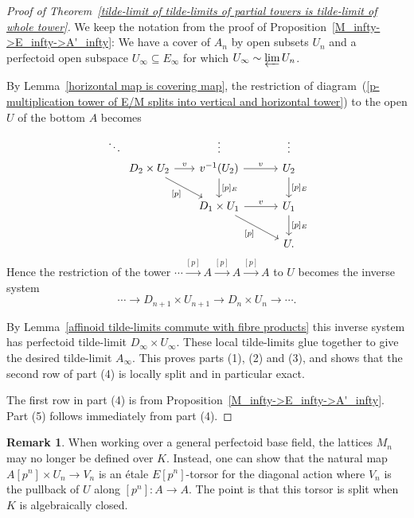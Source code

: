 \documentclass[10pt,oneside]{amsart}
\theoremstyle{definition}
\newtheorem{remark}[theorem]{Remark}
\begin{document}
	\begin{proof}[Proof of Theorem~\ref{tilde-limit of tilde-limits of partial towers is tilde-limit of whole tower}]
We keep the notation from the proof of Proposition~\ref{M_infty->E_infty->A'_infty}: We have a cover of $A_n$ by open subsets $U_n$ and a  perfectoid open subspace $U_\infty\subseteq E_\infty$ for which $U_\infty\sim \varprojlim U_n$.
	 
By Lemma~\ref{horizontal map is covering map}, the restriction of diagram~(\ref{p-multiplication tower of E/M splits into vertical and horizontal tower}) to the open $U$ of the bottom $A$ becomes
\begin{equation*}
		\begin{tikzcd}[column sep={1.1cm,between origins},row sep={0.6cm,between origins}]
			\ddots  &  &  & \vdots &  & \vdots \\
			& D_2\times U_2 \arrow[rr,"v"] \arrow[rrdd, "{[p]}"'] &  & v^{-1}(U_2) \arrow[rr,"v"] \arrow[dd,"{[p]_E}"] &  & U_2 \arrow[dd,"{[p]_E}"] \\
			&  &  &  &  &  \\
			&  &  & D_1\times U_1 \arrow[rrdd, "{[p]}"'] \arrow[rr,"v"] &  & U_1 \arrow[dd,"{[p]_E}"] \\
			&  &  &  &  &  \\
			&  &  &  &  & U.
		\end{tikzcd}
\end{equation*}
Hence the restriction of the tower $\cdots\xrightarrow{[p]}A \xrightarrow{[p]}A\xrightarrow{[p]}A$ to $U$ becomes the inverse system 
	 \[\cdots\rightarrow D_{n+1}\times U_{n+1}\rightarrow D_{n}\times U_n\rightarrow \cdots.\]
	
	By Lemma~\ref{affinoid tilde-limits commute with fibre products} this inverse system has perfectoid tilde-limit $D_\infty \times U_\infty$. These local tilde-limits glue together to give the desired tilde-limit $A_\infty$. This proves parts (1), (2) and (3), and shows that the second row of part (4) is locally split and in particular exact.
	
	The first row in part (4) is from Proposition~\ref{M_infty->E_infty->A'_infty}. Part (5) follows immediately from part (4).
	\end{proof}
	\begin{remark}
		When working over a general perfectoid base field, the lattices $M_n$ may no longer be defined over $K$. Instead, one can show that the natural map $A[p^n]\times U_n\to V_n$ is an \'etale $E[p^n]$-torsor for the diagonal action where $V_n$ is the pullback of $U$ along $[p^n]\colon A\to A$. The point is that this torsor is split when $K$ is algebraically closed.
	\end{remark}
\end{document}

